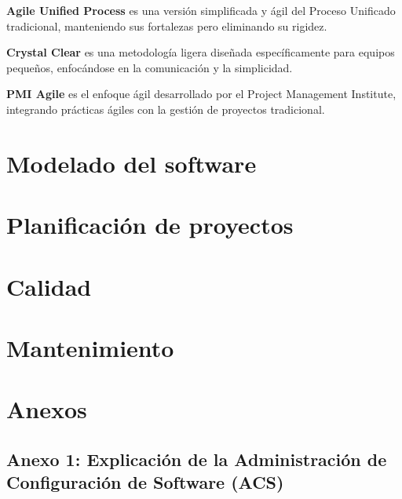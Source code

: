 \documentclass[a4paper,11pt]{report}
\begin{document}
    \textbf{Agile Unified Process} es una versión simplificada y ágil del Proceso Unificado tradicional, manteniendo sus fortalezas pero eliminando su rigidez.

    \textbf{Crystal Clear} es una metodología ligera diseñada específicamente para equipos pequeños, enfocándose en la comunicación y la simplicidad.

    \textbf{PMI Agile} es el enfoque ágil desarrollado por el Project Management Institute, integrando prácticas ágiles con la gestión de proyectos tradicional.






    \chapter{Modelado del software}\label{ch:modelado-del-software}


    \chapter{Planificación de proyectos}\label{ch:planificacion-de-proyectos}
    

    \chapter{Calidad}\label{ch:calidad}
    

    \chapter{Mantenimiento}\label{ch:mantenimiento}
    

    \chapter*{Anexos}

    \clearpage


    \section*{Anexo 1: Explicación de la Administración de Configuración de Software (ACS)}
\end{document}
